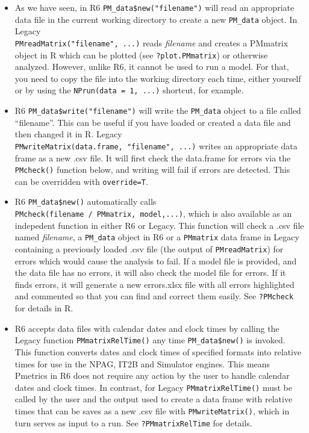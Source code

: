 \documentclass[
]{book}
\begin{document}
\begin{itemize}
\item
  As we have seen, in {R6} \texttt{PM\_data\$new("filename")} will
  read an appropriate data file in the current working directory to create a
  new \texttt{PM\_data} object. In {Legacy}\\
  \texttt{PMreadMatrix("filename",\ ...)} reads \emph{filename} and
  creates a PMmatrix object in R which can be plotted (see
  \texttt{?plot.PMmatrix}) or otherwise analyzed. However, unlike R6, it cannot be used
  to run a model. For that, you need to copy the file into the working directory
  each time, either yourself or by using the \texttt{NPrun(data\ =\ 1,\ ...)} shortcut, for
  example.
\item
  {R6} \texttt{PM\_data\$write("filename")} will write the \texttt{PM\_data} object to a file called
  ``filename''. This can be useful if you have loaded or created a data file and then
  changed it in R. {Legacy}
  \texttt{PMwriteMatrix(data.frame,\ "filename",\ ...)} writes an
  appropriate data frame as a new .csv file. It will first check the
  data.frame for errors via the \texttt{PMcheck()} function below, and writing will
  fail if errors are detected. This can be overridden with \texttt{override=T}.
\item
  {R6} \texttt{PM\_data\$new()} automatically calls
  \texttt{PMcheck(filename\ /\ PMmatrix,\ model,...)}, which is also available as an
  indepedent function in either {R6} or
  {Legacy}. This function will check a .csv
  file named \emph{filename}, a \texttt{PM\_data} object in {R6} or a
  \texttt{PMmatrix} data frame in {Legacy} containing a previously
  loaded .csv file (the output of \texttt{PMreadMatrix}) for errors which would
  cause the analysis to fail. If a model file is provided, and the data
  file has no errors, it will also check the model file for errors. If it
  finds errors, it will generate a new errors.xlsx file with all errors
  highlighted and commented so that you can find and correct them easily.
  See \texttt{?PMcheck} for details in R.
\item
  {R6} accepts data files with calendar dates and clock
  times by calling the {Legacy} function \texttt{PMmatrixRelTime()}
  any time \texttt{PM\_data\$new()} is invoked. This function converts dates and clock times of
  specified formats into relative times for use in the NPAG, IT2B and
  Simulator engines. This means Pmetrics in {R6} does not
  require any action by the user to handle calendar dates and clock times. In
  contrast, for {Legacy} \texttt{PMmatrixRelTime()} must
  be called by the user and the output used to create a data frame with relative
  times that can be saves as a new .csv file with \texttt{PMwriteMatrix()}, which in turn
  serves as input to a run. See \texttt{?PMmatrixRelTime} for details.
\end{itemize}
\end{document}
